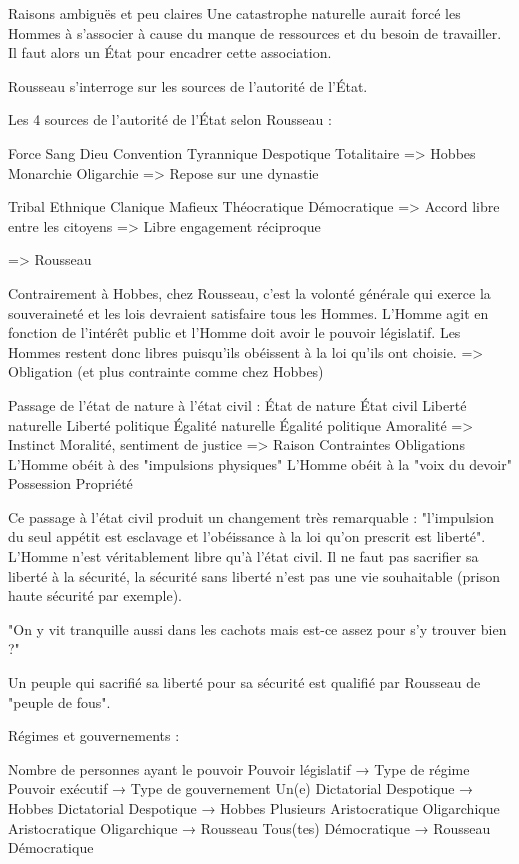 \documentclass[french]{book}
\theoremstyle{definition}
\begin{document}
Raisons ambiguës et peu claires
Une catastrophe naturelle aurait forcé les Hommes à s'associer à cause du manque de ressources et du besoin de travailler. Il faut alors un État pour encadrer cette association.

Rousseau s'interroge sur les sources de l'autorité de l'État.

Les 4 sources de l'autorité de l'État selon Rousseau :

Force 
Sang
Dieu
Convention 
Tyrannique
Despotique
Totalitaire
=> Hobbes
Monarchie
Oligarchie
=> Repose sur une dynastie

Tribal 
Ethnique 
Clanique
Mafieux
Théocratique 
Démocratique 
=> Accord libre entre les citoyens
=> Libre engagement réciproque

=> Rousseau


Contrairement à Hobbes, chez Rousseau, c'est la volonté générale qui exerce la souveraineté et les lois devraient satisfaire tous les Hommes. L'Homme agit en fonction de l'intérêt public et l'Homme doit avoir le pouvoir législatif. Les Hommes restent donc libres puisqu'ils obéissent à la loi qu'ils ont choisie.
=> Obligation (et plus contrainte comme chez Hobbes)

Passage de l'état de nature à l'état civil :
État de nature
État civil
Liberté naturelle
Liberté politique 
Égalité naturelle
Égalité politique
Amoralité
=> Instinct
Moralité, sentiment de justice
=> Raison
Contraintes
Obligations
L'Homme obéit à des "impulsions physiques"
L'Homme obéit à la "voix du devoir"
Possession
Propriété 


Ce passage à l'état civil produit un changement très remarquable : "l'impulsion du seul appétit est esclavage et l'obéissance à la loi qu'on prescrit est liberté".
L'Homme n'est véritablement libre qu'à l'état civil. Il ne faut pas sacrifier sa liberté à la sécurité, la sécurité sans liberté n'est pas une vie souhaitable (prison haute sécurité par exemple).

"On y vit tranquille aussi dans les cachots mais est-ce assez pour s'y trouver bien ?"

Un peuple qui sacrifié sa liberté pour sa sécurité est qualifié par Rousseau de "peuple de fous".

Régimes et gouvernements :

Nombre de personnes ayant le pouvoir
Pouvoir législatif → Type de régime
Pouvoir exécutif → Type de gouvernement 
Un(e)
Dictatorial
Despotique → Hobbes
Dictatorial
Despotique → Hobbes
Plusieurs
Aristocratique
Oligarchique
Aristocratique
Oligarchique → Rousseau
Tous(tes)
Démocratique → Rousseau
Démocratique 
\end{document}
